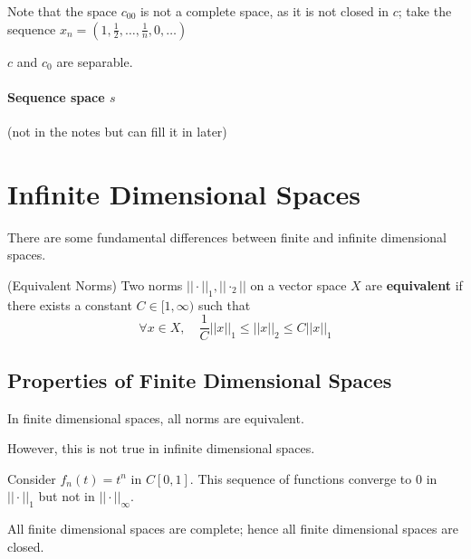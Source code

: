 \documentclass{article}
\begin{document}
\begin{eg}
    Note that the space $c_{00}$ is not a complete space, as it is not
    closed in $c$; take the sequence $x_n = (1, \frac{1}{2}, \ldots, \frac{1}{n}, 0, \ldots)$
\end{eg}

\begin{prop}
    $c$ and $c_0$ are separable.
\end{prop}  


\paragraph*{Sequence space $s$}  
(not in the notes but can fill it in later)  

\section{Infinite Dimensional Spaces}  

There are some fundamental differences between finite and infinite dimensional spaces.  

\begin{defn}
    (Equivalent Norms)
    Two norms $||\cdot||_1, ||\cdot_2||$ on a vector space $X$ are \textbf{equivalent} 
    if there exists a constant $C \in [1, \infty)$ such that  
    \begin{equation*}
        \forall x \in X, \quad \frac{1}{C}||x||_1 \leq ||x||_2 \leq C||x||_1
    \end{equation*}
\end{defn}  

\subsection{Properties of Finite Dimensional Spaces}

\begin{thm}
    In finite dimensional spaces, all norms are equivalent.
\end{thm}  

However, this is not true in infinite dimensional spaces.  

\begin{eg}
    Consider $f_n(t)=t^n$ in $C[0,1]$. This sequence of functions converge to $0$ 
    in $||\cdot||_1$ but not in $||\cdot||_{\infty}$.
\end{eg}

\begin{prop}
    All finite dimensional spaces are complete; hence all finite dimensional spaces are closed.
\end{prop}  
\end{document}
